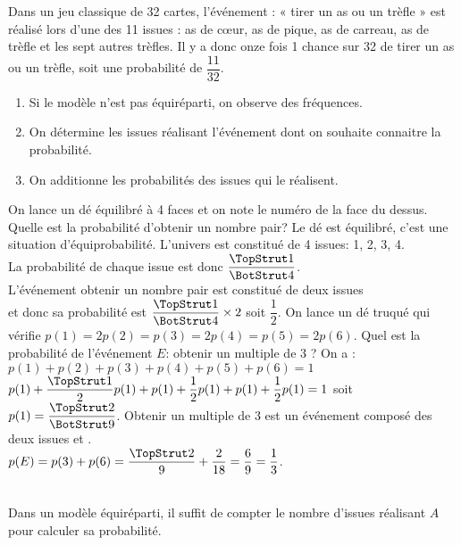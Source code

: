 \begin{exemple*1}
Dans un jeu classique de 32 cartes, l'événement : « tirer un as ou un trèfle » est réalisé lors d'une des 11 issues : as de cœur, as de pique, as de carreau, as de trèfle et les sept autres trèfles. Il y a donc onze fois 1 chance sur 32 de tirer un as ou un trèfle, soit une probabilité de	 $\dfrac{11}{32}$.
\end{exemple*1}

\begin{methode*2*2}
\begin{enumerate}
\item Si le modèle n'est pas équiréparti, on observe des fréquences.
\item On détermine les issues réalisant l'événement dont on souhaite connaitre la probabilité.
\item On additionne les probabilités des issues qui le réalisent.
\end{enumerate}
\exercice \label{2SP3_M_équiprobabilité}
 On lance un dé équilibré à 4 faces et on note le numéro de la face du dessus. Quelle est la probabilité d'obtenir un nombre pair? 
\correction
 Le dé est équilibré, c'est une situation d'équiprobabilité. L'univers est constitué de 4 issues: {1, 2, 3, 4}. \\ La probabilité de chaque issue est donc $\dfrac{\TopStrut 1}{\BotStrut 4}$. \\ L'événement \og obtenir un nombre pair \fg{} est constitué de deux issues\\  \fg{} et \fg{} donc sa probabilité est $\dfrac{\TopStrut 1}{\BotStrut 4} \times 2$ soit $\dfrac{1}{2}$.
 \exercice
 On lance un dé truqué qui vérifie $p(1)=2p(2)=p(3)=2p(4)=p(5)=2p(6)$. Quel est la probabilité de l'événement $E$: \og obtenir un multiple de 3 \fg{}?
 \correction
 On a :\\
 $p(1)+p(2)+p(3)+p(4)+p(5)+p(6)=1$ \\$p(1)+\dfrac{\TopStrut 1}{2}p(1)+p(1)+\dfrac{1}{2}p(1)+p(1)+\dfrac{1}{2}p(1)=1$ soit $p(1)=\dfrac{\TopStrut 2}{\BotStrut 9}$.
 \og Obtenir un multiple de 3 \fg est un événement composé des deux issues  \fg{} et \fg.\\
 $p(E)=p(3)+p(6)=\dfrac{\TopStrut 2}{9}+\dfrac{2}{18}=\dfrac{6}{9}=\dfrac{1}{3}$.
\end{methode*2*2}

\begin{remarque}\\
Dans un modèle équiréparti, il suffit de compter le nombre d'issues réalisant $A$ pour calculer sa probabilité.
\end{remarque}


